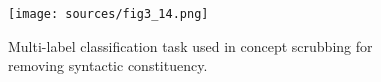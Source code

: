 \begin{figure}[t]
    \centering
    \texttt{[image: sources/fig3\_14.png]}
    \caption{Multi-label classification task used in concept scrubbing for removing syntactic constituency.}
    \label{fig:classification}
\end{figure}
